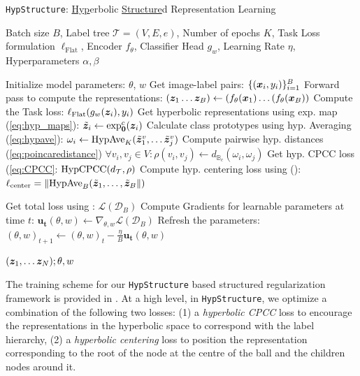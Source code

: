 \begin{algorithm}[ht]
\caption{\texttt{HypStructure}: \underline{Hyp}erbolic \underline{Structure}d Representation Learning}
\label{alg:hypstructure}
\begin{algorithmic}[1]
\Require Batch size $B$, Label tree $\mathcal{T}= (V, E, e)$, Number of epochs $K$, Task Loss formulation $\ell_\text{Flat}$, Encoder $f_\theta$, Classifier Head $g_{w}$, Learning Rate $\eta$, Hyperparameters $\alpha, \beta$ 

\State Initialize model parameters: 
$\theta$, $w$
    \State Get image-label pairs: $\{({\bm{x}}_i, y_i)\}_{i=1}^{B}$
    \State Forward pass to compute the representations: $({\bm{z}}_1 \dots {\bm{z}}_{B}) \gets (f_{\theta}({\bm{x}}_1) \dots (f_{\theta}({\bm{x}}_{B})) $  
    \State Compute the Task loss: $\ell_{\text{Flat}}(g_{w}({\bm{z}}_i), y_i)$
    \State Get hyperbolic representations using exp. map (\cref{eq:hyp_maps}): $\tilde{{\bm{z}}}_i \gets \exp_\mathbf{0}^c({\bm{z}}_i)$
    \State Calculate class prototypes using hyp. Averaging (\cref{eq:hypave}): $\omega_i \gets \text{HypAve}_K(\tilde{{\bm{z}}}_{1}^v, \dots \tilde{{\bm{z}}}_{j}^v)$ 
    \State Compute pairwise hyp. distances (\cref{eq:poincaredistance})  $ \forall v_i, v_j \in V:  \rho(v_i, v_j) \gets d_{\mathbb{B}_c}(\omega_i, \omega_j) $
    \State Get hyp. CPCC loss (\cref{eq:CPCC}: $\text{HypCPCC}(d_{\mathcal{T}}, \rho)$
    \State Compute hyp. centering loss using (): $\ell_\text{center} = \left\lVert\text{HypAve}_B(\tilde{{\bm{z}}}_1, \dots, \tilde{{\bm{z}}}_{B}\right\rVert)$

    \State Get total loss using : $\mathcal{L}(\mathcal{D}_B)$
    \State Compute Gradients for learnable parameters at time $t$:  $\mathbf{u_t}(\theta,w) \gets \nabla_{\theta, w}\mathcal{L}(\mathcal{D}_B)$ 
    \State Refresh the parameters: $(\theta,w)_{t+1} \gets (\theta,w)_{t} - \frac{\eta}{B} \mathbf{u_t}(\theta,w)$ 

    \EndFor 
\EndFor
\Ensure $({\bm{z}}_1, \dots {\bm{z}}_N);\theta,w$
\end{algorithmic}
\end{algorithm}

The training scheme for our \texttt{HypStructure} based structured regularization framework is provided in . At a high level, in \texttt{HypStructure}, we optimize a combination of the following two losses: (1) a \emph{hyperbolic CPCC} loss to encourage the representations in the hyperbolic space to correspond with the label hierarchy, (2) a \emph{hyperbolic centering} loss to position the representation corresponding to the root of the node at the centre of the \Poincare ball and the children nodes around it. 


